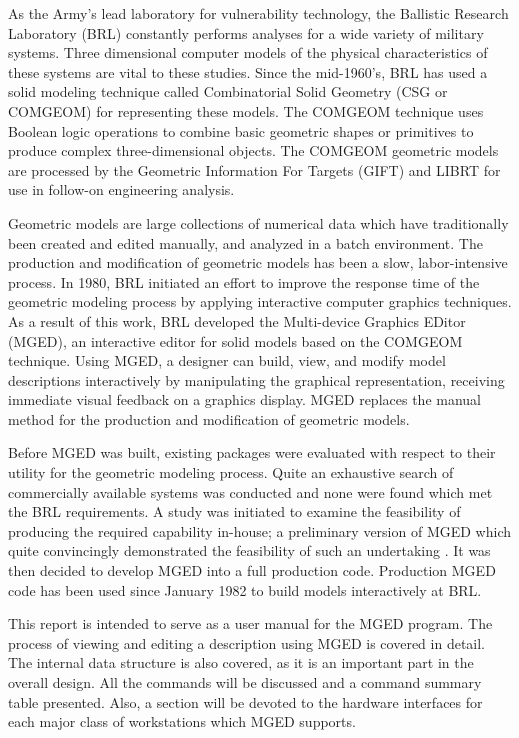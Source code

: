 As the Army's lead laboratory for vulnerability technology, the
Ballistic Research Laboratory (BRL) constantly performs
analyses for a wide variety of military systems.
Three dimensional computer models of the
physical characteristics of these systems
are vital to these studies.
Since the mid-1960's, BRL has used a solid modeling technique
called Combinatorial Solid Geometry (CSG or COMGEOM)
for representing these models.
The COMGEOM technique uses
Boolean logic operations to combine basic geometric
shapes or primitives to produce complex three-dimensional objects.
The COMGEOM geometric models are processed by
the Geometric Information
For Targets (GIFT)
\cite{gift1,gift2}
and LIBRT
\cite{solid-models}
for use in follow-on engineering analysis.

Geometric models are large collections
of numerical data which have traditionally
been created and edited manually, and analyzed in a batch environment.
The production and modification of geometric models has been a slow,
labor-intensive
process.
In 1980, BRL initiated an effort to improve the response
time of the geometric modeling process by applying interactive
computer graphics techniques.
As a result of this work, BRL
developed the Multi-device Graphics EDitor (MGED),
an interactive editor for solid models
based on the COMGEOM technique.
Using MGED, a designer can build, view, and modify model descriptions
interactively by manipulating the graphical representation,
receiving immediate visual feedback on a graphics display.
MGED replaces the manual method for the production
and modification of geometric models.

Before MGED was built,
existing packages were evaluated with respect to
their utility for the geometric modeling process.
Quite an exhaustive search of commercially available systems
was conducted and none were found which met
the BRL requirements.
A study was initiated to examine the feasibility of producing
the required capability in-house;
a preliminary version of MGED which
quite convincingly demonstrated the
feasibility of such an undertaking \cite{interactive-construction}.
It was then decided to develop MGED into a full production code.
Production MGED code has been used since January 1982 to
build models interactively at BRL.

This report is intended to serve as  a user manual
for the MGED program.
The process of viewing and editing a description using MGED
is covered in detail.  The internal data structure is also covered, as
it is an important part in the overall design.
All the commands will be discussed and a command summary table presented.
Also, a section will be devoted to the hardware interfaces for each
major class of workstations which MGED supports.

